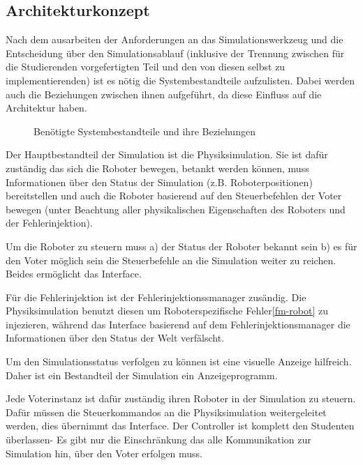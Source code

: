 \subsection{Architekturkonzept}
Nach dem ausarbeiten der Anforderungen an das Simulationswerkzeug und die Entscheidung {\"{u}}ber den Simulationsablauf (inklusive
der Trennung zwischen f{\"{u}}r die Studierenden vorgefertigten Teil und den von diesen selbst zu implementierenden) ist es n{\"{o}}tig
die Systembestandteile aufzulisten. Dabei werden auch die Beziehungen zwischen ihnen aufgef{\"{u}}hrt, da diese Einfluss auf die
Architektur haben.

\begin{figure}
	\centering
	\caption{Ben{\"{o}}tigte Systembestandteile und ihre Beziehungen}
	\label{fig:arch_pre}
\end{figure}

Der Hauptbestandteil der Simulation ist die Physiksimulation. Sie ist daf{\"{u}}r zust{\"{a}}ndig
das sich die Roboter bewegen, betankt werden k{\"{o}}nnen, muss Informationen {\"{u}}ber den
Status der Simulation (z.B. Roboterpositionen) bereitstellen und auch die Roboter basierend
auf den Steuerbefehlen der Voter bewegen (unter Beachtung aller physikalischen Eigenschaften
des Roboters und der Fehlerinjektion).

Um die Roboter zu steuern muss a) der Status der Roboter bekannt sein b) es f{\"{u}}r den
Voter m{\"{o}}glich sein die Steuerbefehle an die Simulation weiter zu reichen. Beides
erm{\"{o}}glicht das Interface.

F{\"{u}}r die Fehlerinjektion ist der Fehlerinjektionssmanager zus{\"{a}}ndig. Die Physiksimulation
benutzt diesen um Roboterspezifische Fehler\ref{fm-robot} zu injezieren, w{\"{a}}hrend das
Interface basierend auf dem Fehlerinjektionsmanager die Informationen {\"{u}}ber den
Status der Welt verf{\"{a}}lscht.

Um den Simulationsstatus verfolgen zu k{\"{o}}nnen ist eine visuelle Anzeige hilfreich. Daher
ist ein Bestandteil der Simulation ein Anzeigeprogramm.

Jede Voterinstanz ist daf{\"{u}}r zust{\"{a}}ndig ihren Roboter in der Simulation zu steuern.
Daf{\"{u}}r m{\"{u}}ssen die Steuerkommandos an die Physiksimulation weitergeleitet werden,
dies {\"{u}}bernimmt das Interface. Der Controller ist komplett den Studenten {\"{u}}berlassen-
Es gibt nur die Einschr{\"{a}}nkung das alle Kommunikation zur Simulation hin, {\"{u}}ber den Voter erfolgen muss.
